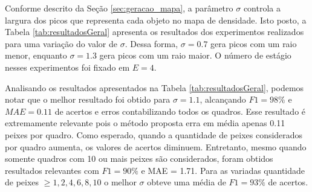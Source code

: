 
Conforme descrito da Seção \ref{sec:geracao_mapa}, a parâmetro $\sigma$ controla a largura dos picos que representa cada objeto no mapa de densidade.
Isto posto, a Tabela \ref{tab:resultadosGeral} apresenta os resultados dos experimentos realizados para uma variação do valor de $\sigma$.
Dessa forma, $\sigma = 0.7$ gera picos com um raio menor, enquanto $\sigma = 1.3$ gera picos com um raio maior. 
O número de estágio nesses experimentos foi fixado em $E = 4$.




Analisando os resultados apresentados na Tabela \ref{tab:resultadosGeral}, podemos notar que o melhor resultado foi obtido para $\sigma = 1.1$, alcançando $F1 = 98\%$ e $MAE = 0.11$ de acertos e erros contabilizando todos os quadros.
Esse resultado é extremamente relevante pois o método proposta erra em média apenas 0.11 peixes por quadro.
Como esperado, quando a quantidade de peixes considerados por quadro aumenta, os valores de acertos diminuem.
Entretanto, mesmo quando somente quadros com 10 ou mais peixes são considerados, foram obtidos resultados relevantes com $F1 = 90\%$ e MAE = 1.71.
Para as variadas quantidade de peixes $\geq 1,2,4,6,8,10$ o melhor $\sigma$ obteve uma média de $F1 =  93\%$ de acertos.



